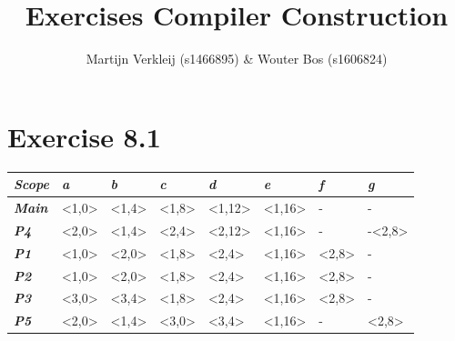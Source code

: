 \documentclass[11pt]{article} %
\title{Exercises Compiler Construction}
\author{Martijn Verkleij (s1466895) \& Wouter Bos (s1606824)}
\begin{document}
\maketitle

\section*{Exercise 8.1}
\begin{tabular}{l|lllllll}
\textit{\textbf{Scope}} & \textit{\textbf{a}}      & \textit{\textbf{b}}      & \textit{\textbf{c}}      & \textit{\textbf{d}}       & \textit{\textbf{e}}       & \textit{\textbf{f}}      & \textit{\textbf{g}}       \\ \hline
\textit{\textbf{Main}}  & \textless1,0\textgreater & \textless1,4\textgreater & \textless1,8\textgreater & \textless1,12\textgreater & \textless1,16\textgreater & -                        & -                         \\
\textit{\textbf{P4}}    & \textless2,0\textgreater & \textless1,4\textgreater & \textless2,4\textgreater & \textless2,12\textgreater & \textless1,16\textgreater & -                        & -\textless2,8\textgreater \\
\textit{\textbf{P1}}    & \textless1,0\textgreater & \textless2,0\textgreater & \textless1,8\textgreater & \textless2,4\textgreater  & \textless1,16\textgreater & \textless2,8\textgreater & -                         \\
\textit{\textbf{P2}}    & \textless1,0\textgreater & \textless2,0\textgreater & \textless1,8\textgreater & \textless2,4\textgreater  & \textless1,16\textgreater & \textless2,8\textgreater & -                         \\
\textit{\textbf{P3}}    & \textless3,0\textgreater & \textless3,4\textgreater & \textless1,8\textgreater & \textless2,4\textgreater  & \textless1,16\textgreater & \textless2,8\textgreater & -                         \\
\textit{\textbf{P5}}    & \textless2,0\textgreater & \textless1,4\textgreater & \textless3,0\textgreater & \textless3,4\textgreater  & \textless1,16\textgreater & -                        & \textless2,8\textgreater 
\end{tabular}
\end{document}
